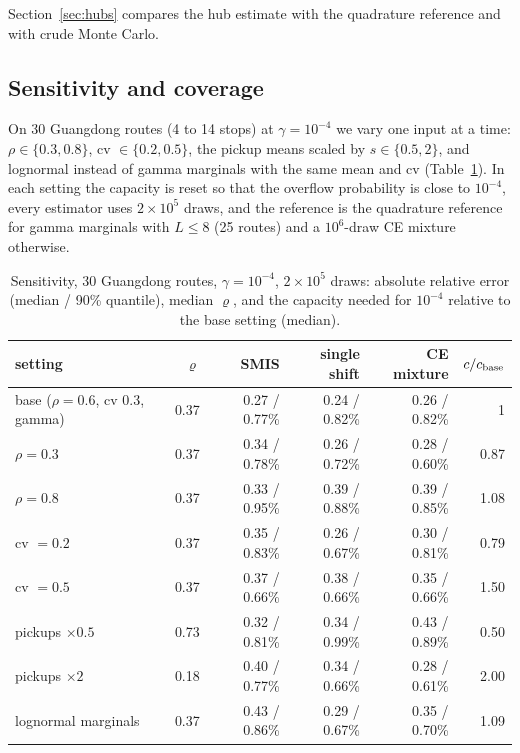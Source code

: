 \documentclass[11pt]{article}
\theoremstyle{definition}
\theoremstyle{remark}
\begin{document}
Section~\ref{sec:hubs} compares the hub estimate with the quadrature reference and with crude Monte Carlo.

\subsection{Sensitivity and coverage}
\label{sec:sensitivity}
On 30 Guangdong routes (4 to 14 stops) at $\gamma=10^{-4}$ we vary one
input at a time: $\rho\in\{0.3,0.8\}$, cv $\in\{0.2,0.5\}$, the pickup means
scaled by $s\in\{0.5,2\}$, and lognormal instead of gamma marginals with the
same mean and cv (Table~\ref{tab:sens}). In each setting the capacity is reset
so that the overflow probability is close to $10^{-4}$, every estimator uses
$2\times10^5$ draws, and the reference is the quadrature reference for gamma
marginals with $L\le8$ (25 routes) and a $10^6$-draw CE mixture otherwise.

\begin{table}[t]
\centering\small
\caption{Sensitivity, 30 Guangdong routes, $\gamma=10^{-4}$, $2\times10^5$
draws: absolute relative error (median / 90\% quantile), median $\varrho$,
and the capacity needed for $10^{-4}$ relative to the base setting (median).}
\label{tab:sens}
\begin{tabular}{lrrrrr}
\toprule
setting & $\varrho$ & SMIS & single shift & CE mixture & $c/c_{\rm base}$ \\
\midrule
base ($\rho=0.6$, cv $0.3$, gamma) & 0.37 & 0.27 / 0.77\% & 0.24 / 0.82\% & 0.26 / 0.82\% & 1 \\
$\rho=0.3$ & 0.37 & 0.34 / 0.78\% & 0.26 / 0.72\% & 0.28 / 0.60\% & 0.87 \\
$\rho=0.8$ & 0.37 & 0.33 / 0.95\% & 0.39 / 0.88\% & 0.39 / 0.85\% & 1.08 \\
cv $=0.2$ & 0.37 & 0.35 / 0.83\% & 0.26 / 0.67\% & 0.30 / 0.81\% & 0.79 \\
cv $=0.5$ & 0.37 & 0.37 / 0.66\% & 0.38 / 0.66\% & 0.35 / 0.66\% & 1.50 \\
pickups $\times0.5$ & 0.73 & 0.32 / 0.81\% & 0.34 / 0.99\% & 0.43 / 0.89\% & 0.50 \\
pickups $\times2$ & 0.18 & 0.40 / 0.77\% & 0.34 / 0.66\% & 0.28 / 0.61\% & 2.00 \\
lognormal marginals & 0.37 & 0.43 / 0.86\% & 0.29 / 0.67\% & 0.35 / 0.70\% & 1.09 \\
\bottomrule
\end{tabular}
\end{table}
\end{document}
